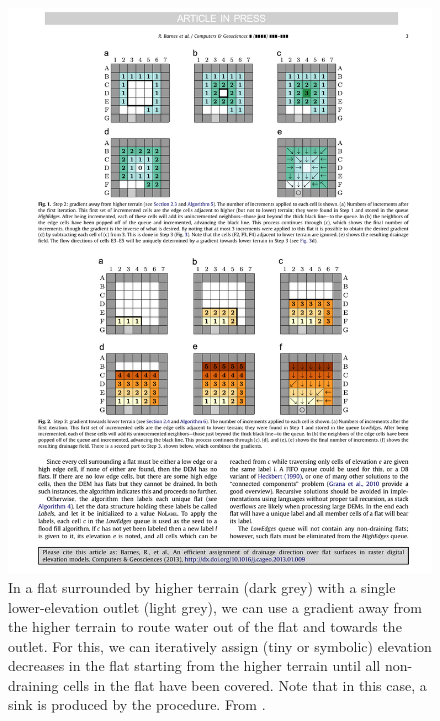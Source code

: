 \begin{figure}[htbp]
\centering
\includegraphics[width=1.0\linewidth]{figs/ht.pdf}
\caption{In a flat surrounded by higher terrain (dark grey) with a single lower-elevation outlet (light grey), we can use a gradient away from the higher terrain to route water out of the flat and towards the outlet.
For this, we can iteratively assign (tiny or symbolic) elevation decreases in the flat starting from the higher terrain until all non-draining cells in the flat have been covered.
Note that in this case, a sink is produced by the procedure.
From \citet{Barnes14}.}%
\label{fig:ht}
\end{figure}

